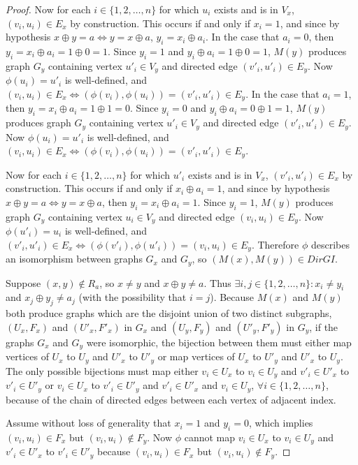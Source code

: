 \documentclass{article}
\theoremstyle{definition}
\begin{document}
\begin{proof}
  Now for each $i\in\{1, 2, \ldots, n\}$ for which $u_i$ exists and is in
  $V_x$, $(v_i, u_i)\in E_x$ by construction. This occurs if and only if
  $x_i=1$, and since by hypothesis $x\oplus y=a \iff y=x\oplus a$,
  $y_i=x_i\oplus a_i$. In the case that $a_i=0$, then $y_i=x_i\oplus a_i=
  1\oplus 0=1$. Since $y_i=1$ and $y_i\oplus a_i=1\oplus 0=1$, $M(y)$ produces
  graph $G_y$ containing vertex $u'_i\in V_y$ and directed edge $(v'_i,
  u'_i)\in E_y$. Now $\phi(u_i)=u'_i$ is well-defined, and $(v_i, u_i)\in
  E_x\iff (\phi(v_i), \phi(u_i))=(v'_i, u'_i)\in E_y$. In the case that
  $a_i=1$, then $y_i=x_i\oplus a_i=1\oplus1=0$. Since $y_i=0$ and $y_i\oplus
  a_i=0\oplus 1=1$, $M(y)$ produces graph $G_y$ containing vertex $u'_i\in V_y$
  and directed edge $(v'_i, u'_i)\in E_y$. Now $\phi(u_i)=u'_i$ is
  well-defined, and $(v_i, u_i)\in E_x\iff (\phi(v_i), \phi(u_i))=(v'_i,
  u'_i)\in E_y$.

  Now for each $i\in\{1, 2, \ldots, n\}$ for which $u'_i$ exists and is in
  $V_x$, $(v'_i, u'_i)\in E_x$ by construction. This occurs if and only if
  $x_i\oplus a_i=1$, and since by hypothesis $x\oplus y=a \iff y=x\oplus a$,
  then $y_i=x_i\oplus a_i=1$. Since $y_i=1$, $M(y)$ produces graph $G_y$
  containing vertex $u_i\in V_y$ and directed edge $(v_i, u_i)\in E_y$. Now
  $\phi(u'_i)=u_i$ is well-defined, and $(v'_i, u'_i)\in E_x\iff (\phi(v'_i),
  \phi(u'_i))=(v_i, u_i)\in E_y$. Therefore $\phi$ describes an isomorphism
  between graphs $G_x$ and $G_y$, so $(M(x),M(y))\in DirGI$.

  Suppose $(x, y)\notin R_a$, so $x\neq y$ and $x\oplus y\neq a$. Thus $\exists
  i,j\in\{1, 2, \ldots, n\}: x_i\neq y_i$ and $x_j\oplus y_j\neq a_j$ (with the
  possibility that $i=j$). Because $M(x)$ and $M(y)$ both produce graphs which
  are the disjoint union of two distinct subgraphs, $(U_x, F_x)$ and $(U'_x,
  F'_x)$ in $G_x$ and $(U_y, F_y)$ and $(U'_y, F'_y)$ in $G_y$, if the graphs
  $G_x$ and $G_y$ were isomorphic, the bijection between them must either map
  vertices of $U_x$ to $U_y$ and $U'_x$ to $U'_y$ or map vertices of $U_x$ to
  $U'_y$ and $U'_x$ to $U_y$. The only possible bijections must map either
  $v_i\in U_x$ to $v_i\in U_y$ and $v'_i\in U'_x$ to $v'_i\in U'_y$ or $v_i\in
  U_x$ to $v'_i\in U'_y$ and $v'_i\in U'_x$ and $v_i\in U_y$, $\forall i\in\{1,
  2, \ldots, n\}$, because of the chain of directed edges between each vertex
  of adjacent index.

  Assume without loss of generality that $x_i=1$ and $y_i=0$, which implies
  $(v_i, u_i)\in F_x$ but $(v_i, u_i)\notin F_y$. Now $\phi$ cannot map $v_i\in
  U_x$ to $v_i\in U_y$ and $v'_i\in U'_x$ to $v'_i\in U'_y$ because $(v_i,
  u_i)\in F_x$ but $(v_i, u_i)\notin F_y$. 


\end{proof}
\end{document}

